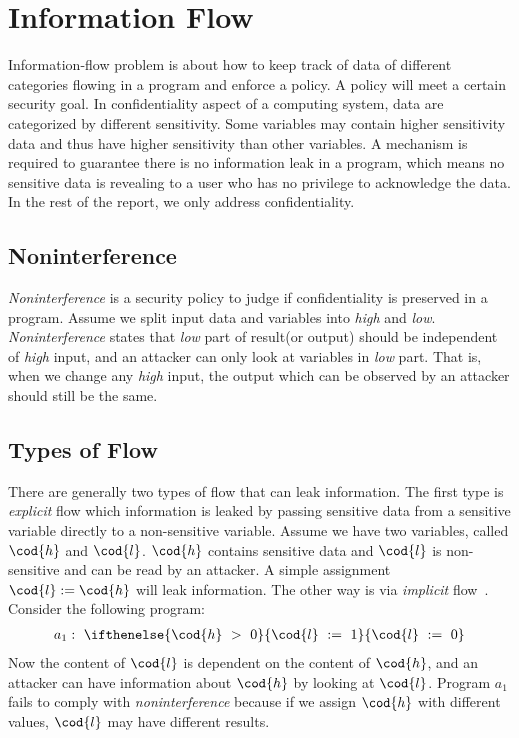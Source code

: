 
\section{Information Flow}
Information-flow problem is about how to keep track of data of different 
categories flowing in a program and enforce a policy. A policy
will meet a certain security goal. In confidentiality aspect of
a computing system, data are categorized by different sensitivity. 
Some variables may contain higher sensitivity data and thus 
have higher sensitivity than other variables. A mechanism is required
to guarantee there is no information leak in a program, which means
no sensitive data is revealing to a user who has no privilege
to acknowledge the data. In the rest of the report, we only
address confidentiality.

\subsection{Noninterference}
{\it Noninterference} is a security policy to judge if confidentiality
is preserved in a program. Assume we split input data and variables
into {\it high} and {\it low}. {\it Noninterference}
states that {\it low} part of result(or output) should be 
independent of {\it high} input, and an attacker can only
look at variables in {\it low} part. That is, when we change any
{\it high} input, the output which can be observed by an attacker 
should still be the same.

\subsection{Types of Flow}
There are generally two types of flow that can leak information. 
The first type is
{\it explicit} flow which information is leaked by passing sensitive
data from a sensitive variable directly to a non-sensitive variable.
Assume we have two variables, called $\cod{h}$ and $\cod{l}$. 
$\cod{h}$ contains sensitive data and $\cod{l}$ is non-sensitive
and can be read by an attacker.
A simple assignment $\cod{l} := \cod{h}$ will leak information.
The other way is via {\it implicit} 
flow~\cite{Denning:Denning:Certification}. Consider the following
program:
\begin{align*}
a_1:~\ifthenelse{\cod{h}~>~0}{\cod{l}~:=~1}{\cod{l}~:=~0}
\end{align*}
Now the content of $\cod{l}$ is dependent on the content of $\cod{h}$,
and an attacker can have information about $\cod{h}$ by looking at
$\cod{l}$. Program $a_1$ fails
to comply with {\it noninterference} because if we assign $\cod{h}$ 
with different values, $\cod{l}$ may have different results.

